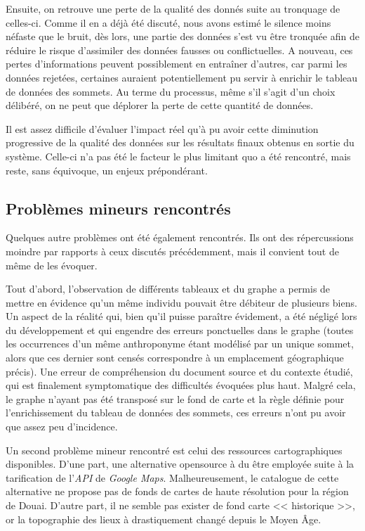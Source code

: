 Ensuite, on retrouve une perte de la qualité des donnés suite au tronquage de celles-ci. Comme il en a déjà été discuté, nous avons estimé le silence moins néfaste que le bruit, dès lors, une partie des données s'est vu être tronquée afin de réduire le risque d'assimiler des données fausses ou conflictuelles. A nouveau, ces pertes d'informations peuvent possiblement en entraîner d'autres, car parmi les données rejetées, certaines auraient potentiellement pu servir à enrichir le tableau de données des sommets. Au terme du processus, même s'il s'agit d'un choix délibéré, on ne peut que déplorer la perte de cette quantité de données.

Il est assez difficile d'évaluer l'impact réel qu'à pu avoir cette diminution progressive de la qualité des données sur les résultats finaux obtenus en sortie du système. Celle-ci n'a pas été le facteur le plus limitant quo a été rencontré, mais reste,  sans équivoque, un enjeux prépondérant.

\subsection{Problèmes mineurs rencontrés}

Quelques autre problèmes ont été également rencontrés. Ils ont des répercussions moindre par rapports à ceux discutés précédemment, mais il convient tout de même de les évoquer.

Tout d'abord, l'observation de différents tableaux et du graphe a permis de mettre en évidence  qu'un même individu pouvait être débiteur de plusieurs biens. Un aspect de la réalité qui, bien qu'il puisse paraître évidement, a été négligé lors du développement et qui engendre des erreurs ponctuelles dans le graphe (toutes les occurrences d'un même anthroponyme étant modélisé par un unique sommet, alors que ces dernier sont censés correspondre à un emplacement géographique précis).
Une erreur de compréhension du document source et du contexte étudié, qui est finalement  symptomatique des difficultés évoquées plus haut.
Malgré cela, le graphe n'ayant pas été transposé sur le fond de carte et la règle définie pour l'enrichissement du tableau de données des sommets, ces erreurs n'ont pu avoir que assez peu d'incidence. 

Un second problème mineur rencontré est celui des ressources cartographiques disponibles. D'une part, une alternative opensource à du être employée suite à la tarification de l'\textit{API} de \textit{Google Maps}. Malheureusement, le catalogue de cette alternative ne propose pas de fonds de cartes de haute résolution pour la région de Douai. D'autre part, il ne semble pas exister de fond carte << historique >>, or la topographie des lieux à drastiquement changé depuis le Moyen Âge.
